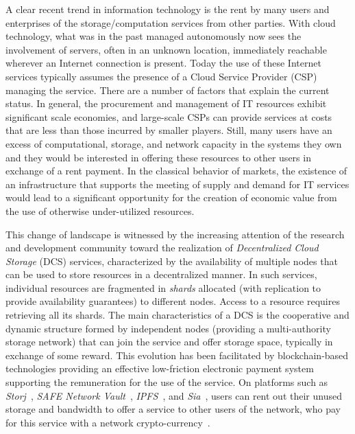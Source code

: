 {A clear recent trend in information technology is the rent by many
users and enterprises of the storage/computation services from other
parties. With cloud technology, what was in the past managed
autonomously now sees the involvement of servers, often in an unknown
location, immediately reachable wherever an Internet connection is
present.  Today the use of these Internet services typically assumes
the presence of a Cloud Service Provider (CSP) managing the service.
There are a number of factors that explain the current status. In
general, the procurement and management of IT resources exhibit
significant scale economies, and large-scale CSPs can provide services
at costs that are less than those incurred by smaller players. Still,
many users have an excess of computational, storage, and network
capacity in the systems they own and they would be interested in
offering these resources to other users in exchange of a rent
payment. In the classical behavior of markets, the existence of an
infrastructure that supports the meeting of supply and demand for IT
services would lead to a significant opportunity for the creation of
economic value from the use of otherwise under-utilized resources.


This change of landscape is witnessed by the increasing attention of
the research and development community toward the realization of {\em
	Decentralized Cloud Storage\/} (DCS) services, characterized by the
availability of multiple nodes that can be used to store resources in
a decentralized manner. In such services, individual resources are
fragmented in {\em shards\/} allocated (with replication to provide
availability guarantees) to different nodes.  Access to a resource
requires retrieving all its shards.  The main characteristics of a DCS
is the cooperative and dynamic structure formed by independent nodes
(providing a multi-authority storage network) that can join the
service and offer storage space, typically in exchange of some reward.
This evolution has been facilitated by blockchain-based technologies
providing an effective low-friction electronic payment system
supporting the remuneration for the use of the service.  On platforms
such as {\em Storj}~\cite{wilkinson2014storj}, {\em SAFE Network
	Vault}~\cite{irvine2010maidsafe,paul2014security}, {\em
	IPFS}~\cite{benet2014ipfs}, and {\em Sia}~\cite{vorick2014sia},
users can rent out their unused storage and bandwidth to offer a
service to other users of the network, who pay for this service with a
network crypto-currency~\cite{sc-distributed-content-delivery}.


}
